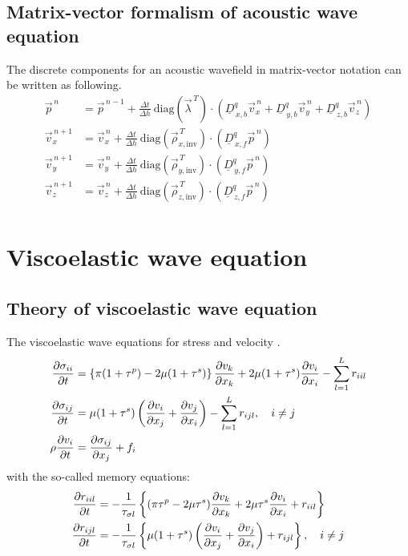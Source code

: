 \documentclass[pdftex,a4paper,parskip,listof=totoc,bibliography=totoc,onehalfspacing,12pt]{scrreprt}
\begin{document}
\section{Matrix-vector formalism of acoustic wave equation}
The discrete components for an acoustic wavefield in matrix-vector notation can be written as following. 
\begin{align*}
	\vec{p}^{\,n} &= \vec{p}^{\,n-1} + \frac{\Delta t}{\Delta h}~ \mathrm{diag} \left( \vec{\lambda}^{\,T} \right) \cdot \left( \underline{D}_{\,x,b}^q \vec{v}_x^{\,n} +\underline{D}_{\,y,b}^q \vec{v}_y^{\,n} + \underline{D}_{\,z,b}^q \vec{v}_z^{\,n} \right) \\
	\vec{v}_x^{\,n+1} &= \vec{v}_x^{\,n} + \frac{\Delta t}{\Delta h} ~ \mathrm{diag} \left( \vec{\rho}_{x,\mathrm{inv}}^{\,T} \right) \cdot \left( \underline{D}_{\,x,f}^q \vec{p}^{\,n}  \right)\\
	\vec{v}_y^{\,n+1} &= \vec{v}_y^{\,n} + \frac{\Delta t}{\Delta h} ~ \mathrm{diag} \left( \vec{\rho}_{y,\mathrm{inv}}^{\,T} \right) \cdot \left( \underline{D}_{\,y,f}^q \vec{p}^{\,n} \right)\\
	\vec{v}_z^{\,n+1} &= \vec{v}_z^{\,n} + \frac{\Delta t}{\Delta h} ~ \mathrm{diag}  \left( \vec{\rho}_{z,\mathrm{inv}}^{\,T} \right) \cdot\left( \underline{D}_{\,z,f}^q \vec{p}^{\,n} \right)\\
\end{align*}

\chapter{Viscoelastic wave equation}
\label{sec:Viscoelastic_wave_equation}

\section{Theory of viscoelastic wave equation}
The viscoelastic wave equations for stress and velocity \citep{bohlen2002parallel}.
\begin{align}
\label{eqn:elastic_wave_stress_xx}
\pdv{\sigma_{ii}}{t} &= \left\{ \pi (1+\tau^p)-2\mu (1+\tau^s) \right\} \pdv{v_k}{x_k} + 2\mu (1+\tau^s) \pdv{v_i}{x_i} - \sum_{l=1}^L r_{iil}\\
\pdv{\sigma_{ij}}{t} &= \mu (1+\tau^s) \left(\pdv{v_i}{x_j} +\pdv{v_j}{x_i}\right) - \sum_{l=1}^L r_{ijl}, \quad i \neq j\\
\rho\pdv{v_i}{t}&=\pdv{\sigma_{ij}}{x_j}+ f_i
\end{align}
with the so-called memory equations:
\begin{align}
\pdv{r_{iil}}{t} &= -\frac{1}{\tau_{\sigma l}} \left\{ (\pi \tau^p-2\mu \tau^s) \pdv{v_k}{x_k} + 2\mu \tau^s \pdv{v_i}{x_i} + r_{iil} \right\}\\
\pdv{r_{ijl}}{t} &= -\frac{1}{\tau_{\sigma l}} \left\{ \mu (1+\tau^s) \left(\pdv{v_i}{x_j} +\pdv{v_j}{x_i}\right) + r_{ijl} \right\}, \quad i \neq j
\end{align}
\end{document}
